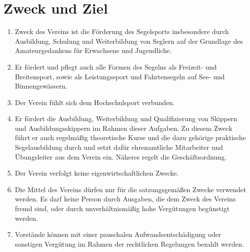 \documentclass[10pt, twocolumn, parskip=half]{scrartcl}
\begin{document}
\section{Zweck und Ziel}
\begin{enumerate}[noitemsep]
	\item Zweck des Vereins ist die Förderung des Segelsports insbesondere durch Ausbildung, Schulung und Weiterbildung von Seglern auf der Grundlage des Amateurgedankens für Erwachsene und Jugendliche.
	\item Er fördert und pflegt auch alle Formen des Segelns als Freizeit- und Breitensport, sowie als Leistungssport und Fahrtensegeln auf See- und Binnengewässern.
	\item Der Verein fühlt sich dem Hochschulsport verbunden.
	\item Er fördert die Ausbildung, Weiterbildung und Qualifizierung von Skippern und Ausbildungsskippern im Rahmen dieser Aufgaben. Zu diesem Zweck führt er auch regelmäßig theoretische Kurse und die dazu gehörige praktische Segelausbildung durch und setzt dafür ehrenamtliche Mitarbeiter und Übungsleiter aus dem Verein ein. Näheres regelt die Geschäftsordnung.
	\item Der Verein verfolgt keine eigenwirtschaftlichen Zwecke.
	\item Die Mittel des Vereins dürfen nur für die satzungsgemäßen Zwecke verwendet werden. Es darf keine Person durch Ausgaben, die dem Zweck des Vereins fremd sind, oder durch unverhältnismäßig hohe Vergütungen begünstigt werden.
	\item Vorstände können mit einer pauschalen Aufwandsentschädigung oder sonstigen Vergütung im Rahmen der rechtlichen Regelungen bezahlt werden.	
\end{enumerate}
\end{document}

